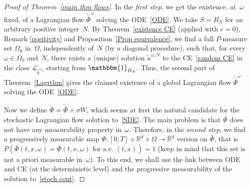 \documentclass[a4paper,10pt]{article}
\newcommand\1{\mathbbm{1}}
\newcommand{\mc}{\mathcal}
\newcommand{\td}{\tilde}
\numberwithin{equation}{section}
\begin{document}
\begin{proof}[Proof of Theorem~\ref{main thm flows}]
In the \emph{first step}, we get the existence, at~$\omega$ fixed, of a Lagrangian flow $\td{\bar{\Phi}}^\omega$ solving the ODE~\eqref{ODE}. We take $S=B_N$ for an arbitrary positive integer~$N$. By Theorem~\ref{existence CE} (applied with $c=0$), Remark \ref{positivity} and Proposition~\ref{Prop equivalence}, we find a full $P$-measure set $\Omega_0$ in~$\Omega$, independently of~$N$ (by a diagonal procedure), such that, for every~$\omega \in \Omega_0$ and~$N$, there exists a (unique) solution $\td{u}^{\omega,N}$ to the CE~\eqref{random CE} in the class $\mc{L}_{\td{b}^\omega}$, starting from $ \1_{B_N}$. Thus, the second part of Theorem~\ref{Lagrthm} gives the claimed existence of a global Lagrangian flow $\td{\bar{\Phi}}^\omega$ solving the ODE~\eqref{ODE}.

Now we define $\bar{\Phi}=\td{\bar{\Phi}}+\sigma W$, which seems at first the natural candidate for the stochastic Lagrangian flow solution to~\eqref{SDE}. The main problem is that $\bar{\Phi}$ does not have any measurability property in~$\omega$. Therefore, in the \emph{second step}, we find a progressively measurable map $\Phi \colon [0,T]\times\mathbb{R}^d\times\Omega\rightarrow \mathbb{R}^d$ version on $\bar{\Phi}$, that is $P(\bar{\Phi}(t,x,\omega)=\Phi(t,x,\omega)\text{ for a.e. }(t,x))=1$ (keep in mind that this set is not a priori measurable in~$\omega$). To this end, we shall use the link between ODE and CE (at the deterministic level) and the progressive measurability of the solution to~\eqref{stoch cont}.


\end{proof}
\end{document}
